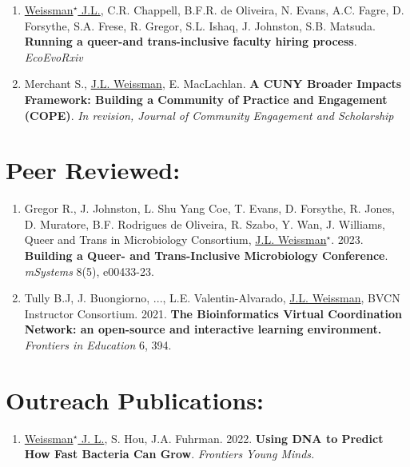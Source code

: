 \documentclass[]{res}
\begin{document}
\begin{resume}
 \begin{enumerate}[leftmargin=*]
 \setlength\itemsep{0.25em}

\item \underline{Weissman$^\star$ J.L.}, C.R. Chappell, B.F.R. de Oliveira, N. Evans, A.C. Fagre, D. Forsythe, S.A. Frese, R. Gregor, S.L. Ishaq, J. Johnston, S.B. Matsuda. {\bf Running a queer-and trans-inclusive faculty hiring process}. \emph{EcoEvoRxiv}

\item Merchant S., \underline{J.L. Weissman}, E. MacLachlan. {\bf A CUNY Broader Impacts Framework: Building a Community of Practice and Engagement (COPE)}. \emph{In revision,  Journal of Community Engagement and Scholarship}
\end{enumerate} 
 
 
\section{Peer Reviewed:} \vspace{0mm}

 \begin{enumerate}[leftmargin=*]
 \setlength\itemsep{0.25em}

 \item Gregor R., J. Johnston, L. Shu Yang Coe, T. Evans, D. Forsythe, R. Jones, D. Muratore, B.F. Rodrigues de Oliveira, R. Szabo, Y. Wan, J. Williams, Queer and Trans in Microbiology Consortium, \underline{J.L. Weissman$^\star$}. 2023. {\bf Building a Queer- and Trans-Inclusive Microbiology Conference}. \emph{mSystems} 8(5), e00433-23.

\item Tully B.J, J. Buongiorno, ..., L.E. Valentin-Alvarado, \underline{J.L. Weissman}, BVCN Instructor Consortium. 2021. {\bf The Bioinformatics Virtual Coordination Network: an open-source and interactive learning environment.} \emph{Frontiers in Education} 6, 394.
\end{enumerate} 
 
\section{Outreach Publications:} \vspace{0mm}

 \begin{enumerate}[leftmargin=*]

\item \underline{Weissman$^\star$ J. L.}, S. Hou, J.A. Fuhrman. 2022. {\bf Using DNA to Predict How Fast Bacteria Can Grow}. \emph{Frontiers Young Minds.}


\end{enumerate}
\end{resume}
\end{document}
